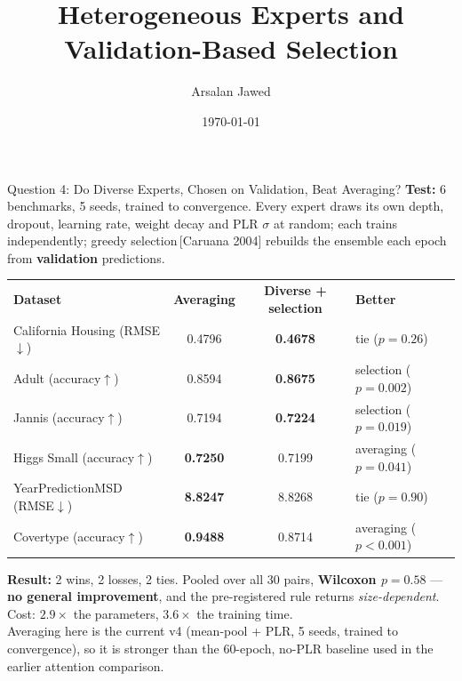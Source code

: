 \documentclass[aspectratio=169, xcolor=table]{beamer}
\title[Bagged Expert Ensembles]{Heterogeneous Experts and Validation-Based Selection}
\author{Arsalan Jawed}
\institute{University of Hildesheim}
\date{\today}
\begin{document}
\begin{frame}{Question 4: Do Diverse Experts, Chosen on Validation, Beat Averaging?}
    \small
    \textbf{Test:} 6 benchmarks, 5 seeds, trained to convergence. Every expert draws its own
    depth, dropout, learning rate, weight decay and PLR $\sigma$ at random; each trains
    independently; greedy selection\,{\scriptsize[Caruana 2004]} rebuilds the ensemble each
    epoch from \textbf{validation} predictions.
    \vspace{0.1cm}
    \begin{table}
        \centering
        \renewcommand{\arraystretch}{1.12}
        \footnotesize
        \begin{tabular}{l | c | c | l}
            \rowcolor{PrimaryColor} \color{white}\textbf{Dataset} & \color{white}\textbf{Averaging} & \color{white}\textbf{Diverse + selection} & \color{white}\textbf{Better} \\
            California Housing (RMSE$\downarrow$) & 0.4796 & \textbf{0.4678} & tie ($p=0.26$) \\
            \rowcolor{LightGrey} Adult (accuracy$\uparrow$) & 0.8594 & \textbf{0.8675} & selection ($p=0.002$) \\
            Jannis (accuracy$\uparrow$) & 0.7194 & \textbf{0.7224} & selection ($p=0.019$) \\
            \rowcolor{LightGrey} Higgs Small (accuracy$\uparrow$) & \textbf{0.7250} & 0.7199 & averaging ($p=0.041$) \\
            YearPredictionMSD (RMSE$\downarrow$) & \textbf{8.8247} & 8.8268 & tie ($p=0.90$) \\
            \rowcolor{LightGrey} Covertype (accuracy$\uparrow$) & \textbf{0.9488} & 0.8714 & averaging ($p<0.001$) \\
        \end{tabular}
    \end{table}
    \vspace{-0.1cm}
    \textbf{Result:} 2 wins, 2 losses, 2 ties. Pooled over all 30 pairs, \textbf{Wilcoxon $p=0.58$}
    --- \textbf{no general improvement}, and the pre-registered rule returns \emph{size-dependent}.
    Cost: $2.9\times$ the parameters, $3.6\times$ the training time.\\[0.1cm]
    \tiny Averaging here is the current v4 (mean-pool + PLR, 5 seeds, trained to convergence), so it is
    stronger than the 60-epoch, no-PLR baseline used in the earlier attention comparison.
\end{frame}
\end{document}
